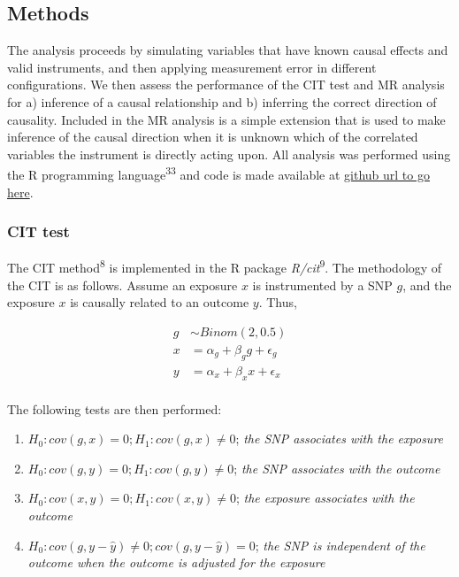 \documentclass[]{article}
\begin{document}
\subsection{Methods}\label{methods}

The analysis proceeds by simulating variables that have known causal
effects and valid instruments, and then applying measurement error in
different configurations. We then assess the performance of the CIT test
and MR analysis for a) inference of a causal relationship and b)
inferring the correct direction of causality. Included in the MR
analysis is a simple extension that is used to make inference of the
causal direction when it is unknown which of the correlated variables
the instrument is directly acting upon. All analysis was performed using
the R programming language\textsuperscript{33} and code is made
available at \href{}{github url to go here}.

\subsubsection{CIT test}\label{cit-test}

The CIT method\textsuperscript{8} is implemented in the R package
\emph{R/cit}\textsuperscript{9}. The methodology of the CIT is as
follows. Assume an exposure \(x\) is instrumented by a SNP \(g\), and
the exposure \(x\) is causally related to an outcome \(y\). Thus,

\[
\begin{aligned}
g & \sim Binom(2, 0.5) \\
x & = \alpha_g + \beta_g g + \epsilon_g \\
y & = \alpha_x + \beta_x x + \epsilon_x \\
\end{aligned}
\]

The following tests are then performed:

\begin{enumerate}
\def\labelenumi{\arabic{enumi}.}
\itemsep1pt\parskip0pt
\item
  \(H_0: cov(g, x) = 0; H_1: cov(g, x) \neq 0\); \emph{the SNP
  associates with the exposure}
\item
  \(H_0: cov(g, y) = 0; H_1: cov(g, y) \neq 0\); \emph{the SNP
  associates with the outcome}
\item
  \(H_0: cov(x, y) = 0; H_1: cov(x, y) \neq 0\); \emph{the exposure
  associates with the outcome}
\item
  \(H_0: cov(g, y - \hat{y}) \neq 0; cov(g, y - \hat{y}) = 0\);
  \emph{the SNP is independent of the outcome when the outcome is
  adjusted for the exposure}
\end{enumerate}
\end{document}
